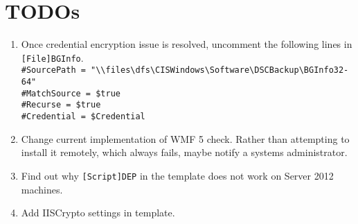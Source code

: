   \section{TODOs}
    \begin{enumerate}[label=(\roman*)]
      \item Once credential encryption issue is resolved, uncomment the following lines in \verb|[File]BGInfo|.\\
      \verb^#SourcePath = "\\files\dfs\CISWindows\Software\DSCBackup\BGInfo32-64"^\\
      \verb^#MatchSource = $true^\\
      \verb^#Recurse = $true^\\
      \verb^#Credential = $Credential^\\
      \item Change current implementation of WMF 5 check. Rather than attempting to install it remotely, which always fails, maybe notify a systems administrator.
      \item Find out why \verb|[Script]DEP| in the template does not work on Server 2012 machines.
      \item Add IISCrypto settings in template.
    \end{enumerate}